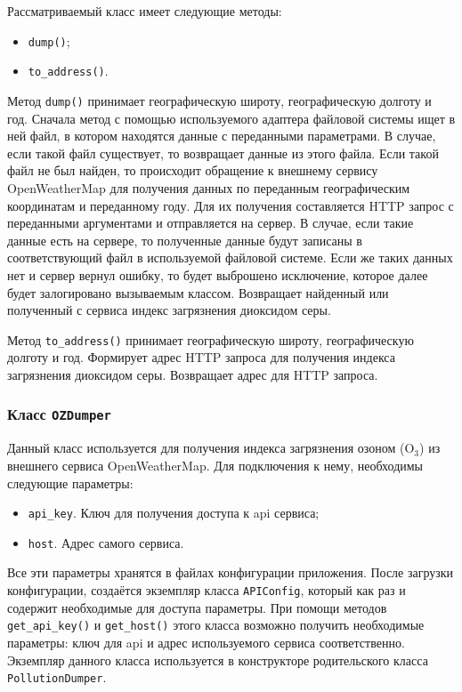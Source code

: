 Рассматриваемый класс имеет следующие методы:
\begin{itemize}
\item \texttt{dump()};
\item \texttt{to\_address()}.
\end{itemize}

Метод \texttt{dump()} принимает географическую широту, географическую долготу и год.
Сначала метод с помощью используемого адаптера файловой системы ищет в ней файл, в котором находятся данные с переданными параметрами.
В случае, если такой файл существует, то возвращает данные из этого файла.
Если такой файл не был найден, то происходит обращение к внешнему сервису OpenWeatherMap для получения данных по переданным географическим координатам и переданному году.
Для их получения составляется HTTP запрос с переданными аргументами и отправляется на сервер.
В случае, если такие данные есть на сервере, то полученные данные будут записаны в соответствующий файл в используемой файловой системе.
Если же таких данных нет и сервер вернул ошибку, то будет выброшено исключение, которое далее будет залогировано вызываемым классом.
Возвращает найденный или полученный с сервиса индекс загрязнения диоксидом серы.

Метод \texttt{to\_address()} принимает географическую широту, географическую долготу и год.
Формирует адрес HTTP запроса для получения индекса загрязнения диоксидом серы.
Возвращает адрес для HTTP запроса.



\subsubsection{Класс \texttt{OZDumper}}
Данный класс используется для получения индекса загрязнения озоном ($ \text{O}_{\text{3}} $) из внешнего сервиса OpenWeatherMap.
Для подключения к нему, необходимы следующие параметры:

\begin{itemize}
\item \texttt{api\_key}. Ключ для получения доступа к api сервиса;
\item \texttt{host}. Адрес самого сервиса.
\end{itemize}

Все эти параметры хранятся в файлах конфигурации приложения.
После загрузки конфигурации, создаётся экземпляр класса \texttt{APIConfig}, который как раз и содержит необходимые для доступа параметры.
При помощи методов \texttt{get\_api\_key()} и \texttt{get\_host()} этого класса возможно получить необходимые параметры: ключ для api и адрес используемого сервиса соответственно.
Экземпляр данного класса используется в конструкторе родительского класса \texttt{PollutionDumper}.

